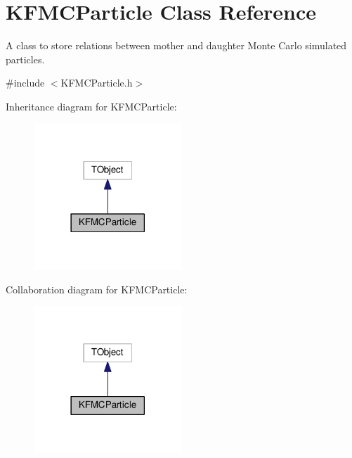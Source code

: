 \hypertarget{classKFMCParticle}{}\section{K\+F\+M\+C\+Particle Class Reference}
\label{classKFMCParticle}


A class to store relations between mother and daughter Monte Carlo simulated particles.  




{\ttfamily \#include $<$K\+F\+M\+C\+Particle.\+h$>$}



Inheritance diagram for K\+F\+M\+C\+Particle\+:\nopagebreak
\begin{figure}[H]
\begin{center}
\leavevmode
\includegraphics[width=158pt]{classKFMCParticle__inherit__graph}
\end{center}
\end{figure}


Collaboration diagram for K\+F\+M\+C\+Particle\+:\nopagebreak
\begin{figure}[H]
\begin{center}
\leavevmode
\includegraphics[width=158pt]{classKFMCParticle__coll__graph}
\end{center}
\end{figure}
